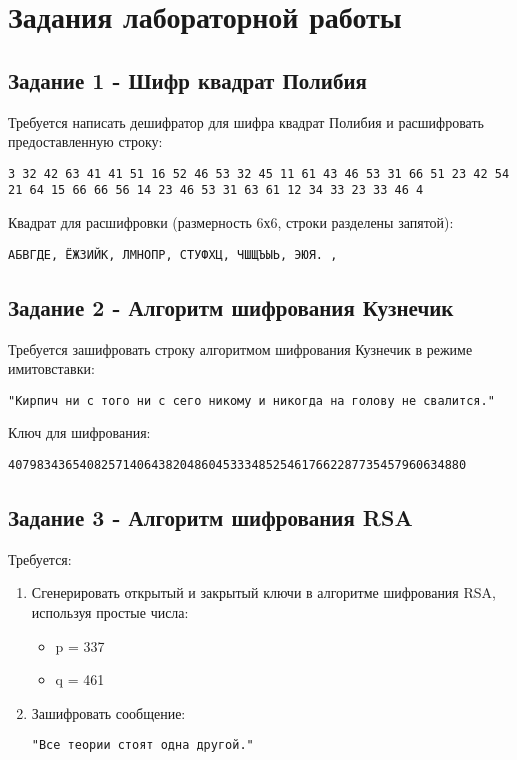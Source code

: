 \documentclass[a4paper, 14pt]{extarticle}
\begin{document}
\section{Задания лабораторной работы}

\subsection{Задание 1 - Шифр квадрат Полибия}
Требуется написать дешифратор для шифра квадрат Полибия и расшифровать предоставленную строку:
\begin{lstlisting}
3 32 42 63 41 41 51 16 52 46 53 32 45 11 61 43 46 53 31 66 51 23 42 54 21 64 15 66 66 56 14 23 46 53 31 63 61 12 34 33 23 33 46 4
\end{lstlisting}

Квадрат для расшифровки (размерность 6х6, строки разделены запятой):
\begin{lstlisting}
АБВГДЕ, ЁЖЗИЙК, ЛМНОПР, СТУФХЦ, ЧШЩЪЫЬ, ЭЮЯ. ,
\end{lstlisting}

\subsection{Задание 2 - Алгоритм шифрования Кузнечик}
Требуется зашифровать строку алгоритмом шифрования Кузнечик в режиме имитовставки:
\begin{lstlisting}
"Кирпич ни с того ни с сего никому и никогда на голову не свалится."
\end{lstlisting}

Ключ для шифрования:
\begin{lstlisting}
4079834365408257140643820486045333485254617662287735457960634880
\end{lstlisting}

\subsection{Задание 3 - Алгоритм шифрования RSA}
Требуется:
\begin{enumerate}
    \item Сгенерировать открытый и закрытый ключи в алгоритме шифрования RSA, используя простые числа:
    \begin{itemize}
        \item p = 337
        \item q = 461
    \end{itemize}
    \item Зашифровать сообщение:
    \begin{lstlisting}
"Все теории стоят одна другой."
    \end{lstlisting}
\end{enumerate}
\end{document}
